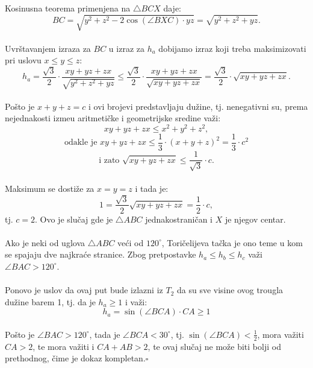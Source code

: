 \documentclass[11pt,letter]{article}
\newcommand{\qed}{\hfill $\square$ \bigskip}
\begin{document}
\indent Kosinusna teorema primenjena na $\bigtriangleup BCX$ daje:
\\
$$BC=\sqrt{y^2+z^2-2\cos{(\angle BXC)}\cdot yz}=\sqrt{y^2+z^2+yz}.$$
\\
\indent Uvr\v stavanjem izraza za $BC$ u izraz za $h_a$ dobijamo izraz koji treba maksimizovati  pri uslovu $x\leqslant y\leqslant z$:
$$h_a=\frac{\sqrt3}{2}\cdot \frac{xy+yz+zx}{\sqrt{y^2+z^2+yz}}\leqslant \frac{\sqrt3}{2}\cdot \frac{xy+yz+zx}{\sqrt{xy+yz+zx}}=\frac{\sqrt3}{2}\cdot \sqrt{xy+yz+zx}.$$
\\
\indent Po\v sto je $x+y+z=c$ i ovi brojevi predstavljaju du\v zine, tj. nenegativni su, prema nejednakosti izme\dj u aritmeti\v cke i geometrijske sredine va\v zi:
$$xy+yz+zx\leqslant x^2+y^2+z^2,$$
$$\text{odakle je } xy+yz+zx\leqslant \frac{1}{3}\cdot (x+y+z)^2=\frac{1}{3}\cdot c^2$$
$$\text{i zato } \sqrt{xy+yz+zx}\leqslant \frac{1}{\sqrt3}\cdot c.$$
\\
\indent Maksimum se dosti\v ze za $x=y=z$ i tada je:
$$1=\frac{\sqrt3}{2}\sqrt{xy+yz+zx}=\frac{1}{2}\cdot c,$$
tj. $c=2$. Ovo je slu\v caj gde je $\bigtriangleup ABC$ jednakostrani\v can i $X$ je njegov centar.
\\
\\
\indent Ako je neki od uglova $\bigtriangleup ABC$ ve\' ci od $120^\circ$, Tori\v celijeva ta\v cka je ono teme u kom se spajaju dve najkra\' ce stranice. Zbog pretpostavke $h_a\leqslant h_b\leqslant h_c$ va\v zi $\angle BAC>120^\circ$.
\\
\\
\indent Ponovo je uslov da ovaj put bude izlazni iz $T_2$ da su sve visine ovog trougla du\v zine barem 1, tj. da je $h_a\geqslant 1$ i va\v zi:
$$h_a=\sin{(\angle BCA)}\cdot CA\geqslant 1$$
\\
\indent Po\v sto je $\angle BAC>120^\circ$, tada je $\angle BCA<30^\circ$, tj. $\sin(\angle BCA)<\frac{1}{2}$, mora va\v ziti $CA>2$, te mora va\v ziti i $CA+AB>2$, te ovaj slu\v caj ne mo\v ze biti bolji od prethodnog, \v cime je dokaz kompletan.\qed
\\
\end{document}
